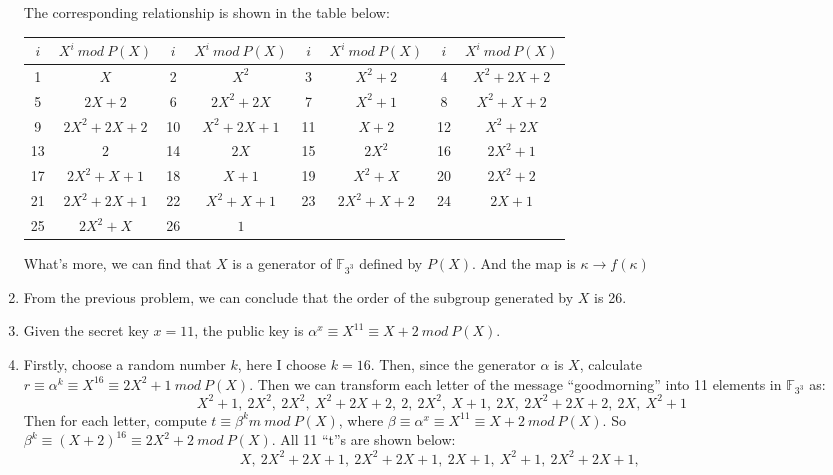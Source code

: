 \documentclass[12pt, a4paper]{article}
\begin{document}
\begin{enumerate}
          The corresponding relationship is shown in the table below:
          \begin{center}
              \begin{tabular}{c|c||c|c||c|c||c|c}
                  \hline
                  $i$ & $X^i\ mod\ P(X)$ & $i$ & $X^i\ mod\ P(X)$ & $i$ & $X^i\ mod\ P(X)$ & $i$ & $X^i\ mod\ P(X)$\\
                  \hline
                  1 & $X$ & 2 & $X^2$ & 3 & $X^2 + 2$ & 4 & $X^2 + 2X + 2$\\
                  5 & $2X + 2$ & 6 & $2X^2 + 2X$ & 7 & $X^2 + 1$ & 8 & $X^2 + X + 2$\\
                  9 & $2X^2 + 2X + 2$ & 10 & $X^2 + 2X + 1$ & 11 & $X + 2$ & 12 & $X^2 + 2X$\\
                  13 & $2$ & 14 & $2X$ & 15 & $2X^2$ & 16 & $2X^2 + 1$\\
                  17 & $2X^2 + X + 1$ & 18 & $X + 1$ & 19 & $X^2 + X$ & 20 & $2X^2 + 2$\\
                  21 & $2X^2 + 2X + 1$ & 22 & $X^2 + X + 1$ & 23 & $2X^2 + X + 2$ & 24 & $2X + 1$\\
                  25 & $2X^2 + X$ & 26 & $1$ & & & & 
              \end{tabular}
          \end{center}
          What's more, we can find that $X$ is a generator of $\mathbb{F}_{3^3}$ defined by $P(X)$. 
          And the map is $\kappa\rightarrow f(\kappa)$
    \item From the previous problem, we can conclude that the order of the subgroup generated by $X$ is 26.
    \item Given the secret key $x = 11$, the public key is $\alpha^x \equiv X^{11} \equiv X+2\ mod\ P(X)$.
    \item Firstly, choose a random number $k$, here I choose $k = 16$. 
          Then, since the generator $\alpha$ is $X$, 
          calculate $r \equiv \alpha^k \equiv X^{16} \equiv 2X^2+1\ mod\ P(X)$. 
          Then we can transform each letter of the message ``goodmorning'' into 11 elements in $\mathbb{F}_{3^3}$ as:
          $$X^2+1,\ 2X^2,\ 2X^2,\ X^2+2X+2,\ 2,\ 2X^2,\ X+1,\ 2X,\ 2X^2+2X+2,\ 2X,\ X^2+1$$
          Then for each letter, compute $t \equiv \beta^k m\ mod\ P(X)$, 
          where $\beta \equiv \alpha^x \equiv X^{11} \equiv X + 2\ mod\ P(X)$. So $\beta^k \equiv (X+2)^{16} \equiv 2X^2+2\ mod\ P(X)$. 
          All 11 ``t''s are shown below:
          $$X,\ 2X^2+2X+1,\ 2X^2+2X+1,\ 2X+1,\ X^2+1,\ 2X^2+2X+1,\ $$

\end{enumerate}
\end{document}
